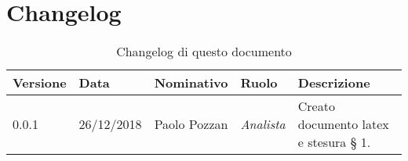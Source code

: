 \section*{Changelog}
\begin{table}[tbph]
        \centering
        \begin{tabularx}{\textwidth}{|l|l|l|l|X|}
                \hline
                \textbf{Versione} & \textbf{Data} & \textbf{Nominativo}  & \textbf{Ruolo} & 
                \textbf{Descrizione}\\
                \hline 
                
                

                \hline
                0.0.1 & 26/12/2018 & Paolo Pozzan & \textit{Analista}
                & Creato documento latex e stesura § 1.\\
                
                \hline
                
        \end{tabularx}
        \caption{Changelog di questo documento}
\end{table}